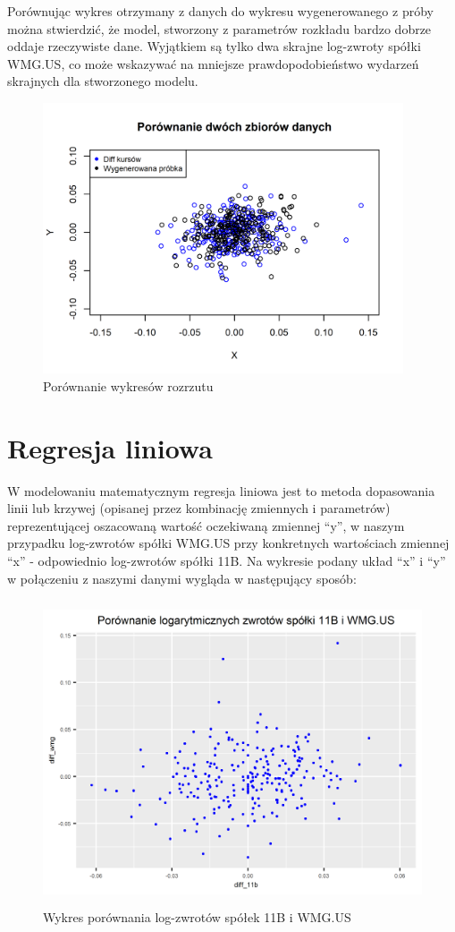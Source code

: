 \documentclass[a4paper,11pt]{article}
\begin{document}
\smallskip

Porównując wykres otrzymany z danych do wykresu wygenerowanego z próby można stwierdzić, że model, stworzony z parametrów rozkładu bardzo dobrze oddaje rzeczywiste dane. Wyjątkiem są tylko dwa skrajne log-zwroty spółki WMG.US, co może wskazywać na mniejsze prawdopodobieństwo wydarzeń skrajnych dla stworzonego modelu. 


\begin{figure}[h]
\centering
\includegraphics[width=10.66cm, height=8cm]{img/diff_porownanie_wykresow_rozrzutu.png}
\caption{Porównanie wykresów rozrzutu}
\end{figure}


\newpage
\section{Regresja liniowa}
W modelowaniu matematycznym regresja liniowa jest to metoda dopasowania linii lub krzywej (opisanej przez kombinację zmiennych i parametrów) reprezentującej oszacowaną wartość oczekiwaną zmiennej “y”, w naszym przypadku log-zwrotów spółki WMG.US przy konkretnych wartościach zmiennej “x” - odpowiednio log-zwrotów spółki 11B. Na wykresie podany układ “x” i “y” w połączeniu z naszymi danymi wygląda w następujący sposób:

\begin{figure}[h]
\centering
\includegraphics[width=12cm, height=9cm]{img/reg_porownanie.png}
\caption{Wykres porównania log-zwrotów spółek 11B i WMG.US}
\end{figure}
\end{document}
